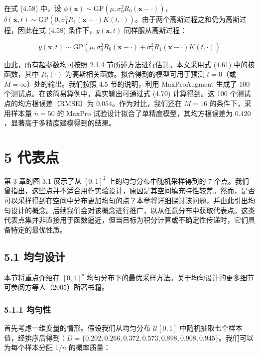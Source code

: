 \documentclass{ctexart}
\begin{document}
在式 (4.58) 中，设 $\phi(\boldsymbol{x})\sim\mathrm{GP}(\mu,\sigma_0^2R_0(\boldsymbol{x}-\cdot))$，$\delta(\boldsymbol{x},t)\sim\mathrm{GP}(0,\sigma_1^2R_1(\boldsymbol{x}-\cdot)K(t,\cdot))$。由于两个高斯过程之和仍为高斯过程，因此在式 (4.58) 条件下，$y(\boldsymbol{x},t)$ 同样服从高斯过程：

\begin{equation*}
y(\boldsymbol{x},t)\sim\mathrm{GP}\left(\mu,\sigma_0^2R_0(\boldsymbol{x}-\cdot)+\sigma_1^2R_1(\boldsymbol{x}-\cdot)K(t,\cdot)\right)
\end{equation*}

由此，所有超参数均可按照 2.1.4 节所述方法进行估计。本文采用式 (4.61) 中的核函数，其中 $R_t(\cdot)$ 为高斯相关函数。拟合得到的模型可用于预测 $t=0$（或 $M=\infty$）处的输出。我们按照 4.5 节的说明，利用 MaxProAugment 生成了 100 个测试点。在该简易算例中，真实输出可通过式 (4.70) 计算得到。这 100 个测试点的均方根误差（RMSE）为 $0.054$。作为对比，我们还在 $M=16$ 的条件下，采用样本量 $\overline n=50$ 的 MaxPro 试验设计拟合了单精度模型，其均方根误差为 $0.420$，显著高于多精度建模得到的结果。

\section*{5 代表点}

第 3 章的图 3.1 展示了从 $[0,1]^2$ 上的均匀分布中随机采样得到的 7 个点。我们曾指出，这些点并不适合用作实验设计，原因是其空间填充特性较差。然而，是否可以采样得到在空间中分布更加均匀的点？本章将详细探讨该问题，并由此引出均匀设计的概念。后续我们会对该概念进行推广，以从任意分布中获取代表点。这类代表点集并非直接用于函数逼近，但当目标为积分计算或不确定性传递时，它们具备特定的最优性质。

\subsection*{5.1 均匀设计}

本节将重点介绍在 $[0,1]^p$ 均匀分布下的最优采样方法。关于均匀设计的更多细节可参阅方等人（2005）所著书籍。

\subsubsection*{5.1.1 均匀性}

首先考虑一维变量的情形。假设我们从均匀分布 $\mathcal{U}[0,1]$ 中随机抽取七个样本值，经排序后得到：$D=\{0.202,0.266,0.372,0.573,0.898,0.908,0.945\}$。我们可以为每个样本分配 $1/n$ 的概率质量：
\end{document}
